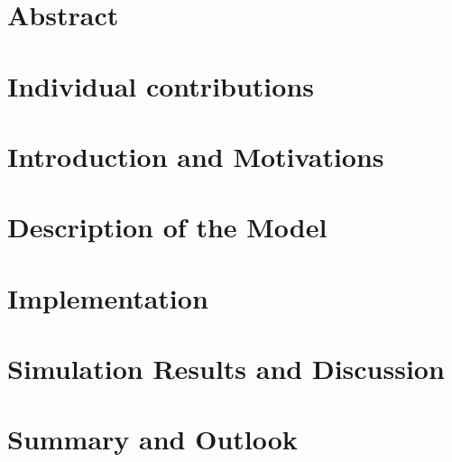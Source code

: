 \documentclass[11pt]{article}
\begin{document}
\section{Abstract}


\section{Individual contributions}


\section{Introduction and Motivations}


\section{Description of the Model} \label{modeldesc}


\section{Implementation}


\section{Simulation Results and Discussion}

\section{Summary and Outlook}

\begin{flushleft}


\end{flushleft}
\end{document}
